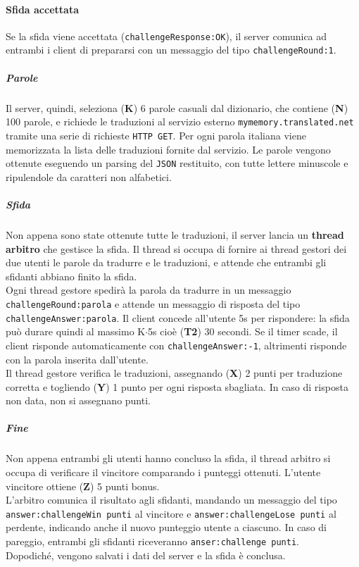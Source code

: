 \documentclass[10pt]{article}
\begin{document}
{\paragraph{Sfida accettata} Se la sfida viene accettata (\texttt{challengeResponse:OK}), il server comunica ad entrambi i client di prepararsi con un messaggio del tipo \texttt{challengeRound:1}.
\subparagraph{Parole} Il server, quindi, seleziona (\textbf{K}) 6 parole casuali dal dizionario, che contiene (\textbf{N}) 100 parole, e richiede le traduzioni al servizio esterno \texttt{mymemory.translated.net} tramite una serie di richieste \texttt{HTTP GET}. Per ogni parola italiana viene memorizzata la lista delle traduzioni fornite dal servizio. Le parole vengono ottenute eseguendo un parsing del \texttt{JSON} restituito, con tutte lettere minuscole e ripulendole da caratteri non alfabetici.
\subparagraph{Sfida} Non appena sono state ottenute tutte le traduzioni, il server lancia un \textbf{thread arbitro} che gestisce la sfida. Il thread si occupa di fornire ai thread gestori dei due utenti le parole da tradurre e le traduzioni, e attende che entrambi gli sfidanti abbiano finito la sfida.\\
Ogni thread gestore spedirà la parola da tradurre in un messaggio \texttt{challengeRound:parola} e attende un messaggio di risposta del tipo \texttt{challengeAnswer:parola}. Il client concede all'utente 5s per rispondere: la sfida può durare quindi al massimo K$\cdot$5s cioè (\textbf{T2}) 30 secondi. Se il timer scade, il client risponde automaticamente con \texttt{challengeAnswer:-1}, altrimenti risponde con la parola inserita dall'utente.\\
Il thread gestore verifica le traduzioni, assegnando (\textbf{X}) 2 punti per traduzione corretta e togliendo (\textbf{Y}) 1 punto per ogni risposta sbagliata. In caso di risposta non data, non si assegnano punti.
\subparagraph{Fine} Non appena entrambi gli utenti hanno concluso la sfida, il thread arbitro si occupa di verificare il vincitore comparando i punteggi ottenuti. L'utente vincitore ottiene (\textbf{Z}) 5 punti bonus.\\
L'arbitro comunica il risultato agli sfidanti, mandando un messaggio del tipo \texttt{answer:challengeWin punti} al vincitore e \texttt{answer:challengeLose punti} al perdente, indicando anche il nuovo punteggio utente a ciascuno. In caso di pareggio, entrambi gli sfidanti riceveranno \texttt{anser:challenge punti}.\\
Dopodiché, vengono salvati i dati del server e la sfida è conclusa.
\pagebreak
}
\end{document}
